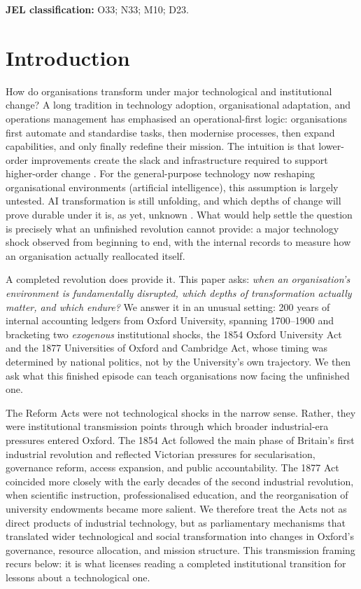 \documentclass[11pt]{article}
\begin{document}
\smallskip
\noindent\textbf{JEL classification:} O33; N33; M10; D23.


\section{Introduction}
\label{sec:intro}

How do organisations transform under major technological and institutional change? A long
tradition in technology adoption, organisational adaptation, and operations management has
emphasised an operational-first logic: organisations first automate and standardise tasks, then
modernise processes, then expand capabilities, and only finally redefine their mission. The
intuition is that lower-order improvements create the slack and infrastructure required to
support higher-order change \citep{brynjolfsson2000beyond, bresnahan2002it}. For the
general-purpose technology now reshaping organisational environments (artificial intelligence),
this assumption is largely untested. AI transformation is still unfolding, and which depths
of change will prove durable under it is, as yet, unknown \citep{vial2019digital,
raisch2021ai}. What would help settle the question is precisely what an unfinished revolution
cannot provide: a major technology shock observed from beginning to end, with the internal
records to measure how an organisation actually reallocated itself.

A completed revolution does provide it. This paper asks: \emph{when an organisation's environment
is fundamentally disrupted, which depths of transformation actually matter, and which endure?}
We answer it in an unusual setting: 200 years of internal accounting ledgers from Oxford
University, spanning 1700--1900 and bracketing two \emph{exogenous} institutional shocks, the
1854 Oxford University Act and the 1877 Universities of Oxford and Cambridge Act, whose timing
was determined by national politics, not by the University's own trajectory. We then ask what
this finished episode can teach organisations now facing the unfinished one.

The Reform Acts were not technological shocks in the narrow sense. Rather, they were
institutional transmission points through which broader industrial-era pressures entered Oxford.
The 1854 Act followed the main phase of Britain's first industrial revolution and reflected
Victorian pressures for secularisation, governance reform, access expansion, and public
accountability. The 1877 Act coincided more closely with the early decades of the second
industrial revolution, when scientific instruction, professionalised education, and the
reorganisation of university endowments became more salient. We therefore treat the Acts not as
direct products of industrial technology, but as parliamentary mechanisms that translated wider
technological and social transformation into changes in Oxford's governance, resource allocation,
and mission structure. This transmission framing recurs below: it is what licenses reading a
completed institutional transition for lessons about a technological one.
\end{document}
